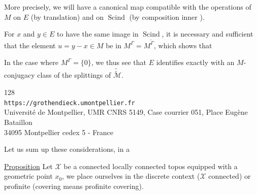 More precisely, we will have a canonical map
compatible with the operations of $M$ on $E$ (by translation) and on $\operatorname{Scind}$ (by composition  inner ).

For $x$ and $y\in E$ to have the same image in $\operatorname{Scind}$, it is necessary and sufficient that the element $u=y-x\in M$ be in $M^\Gamma=M^{\widetilde\Gamma}$, which shows that
\diagram{
\[
\begin{tikzcd}[column sep=large,row sep=large]
\text{the homomorphism }E \arrow[r,no head] & \operatorname{Scind}\text{ is injective} \\
& \text{iff}\quad M^\Gamma=\{0\}\quad .
\end{tikzcd}
\tag{286}
\]
}

In the case where $M^\Gamma=\{0\}$, we thus see that $E$ identifies exactly with an $M$-conjugacy class of the splittings of $\widetilde{\widetilde{\mathcal M}}$.


\begin{center}
\small
128\\
\texttt{https://grothendieck.umontpellier.fr}\\
Université de Montpellier, UMR CNRS 5149, Case courrier 051, Place Eugène Bataillon\\
34095 Montpellier cedex 5 - France
\end{center}


Let us sum up these considerations, in a

\uline{Proposition} Let $\mathcal X$ be a  connected locally connected topos equipped with a geometric point $x_0$, we place ourselves in the discrete context ($\mathcal X$   connected) or profinite (covering means profinite covering).

